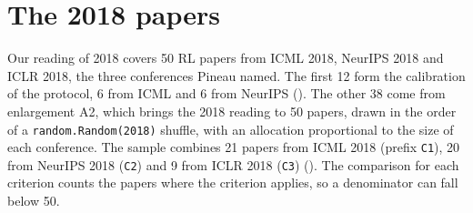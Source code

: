 
\section{The 2018 papers}
\label{sec:c-2018}

Our reading of 2018 covers 50 RL papers from ICML 2018, NeurIPS 2018 and ICLR 2018, the three
conferences Pineau named. The first 12 form the calibration of the protocol, 6 from ICML and 6 from
NeurIPS (). The other 38 come from enlargement A2, which brings the 2018 reading to 50 papers, drawn in the order of
a \texttt{random.Random(2018)} shuffle, with an allocation proportional to the size of each
conference. The sample combines 21 papers from ICML 2018 (prefix \texttt{C1}), 20 from
NeurIPS 2018 (\texttt{C2}) and 9 from ICLR 2018 (\texttt{C3}) ().
The comparison for each criterion counts the papers where the criterion applies, so a denominator
can fall below 50.


